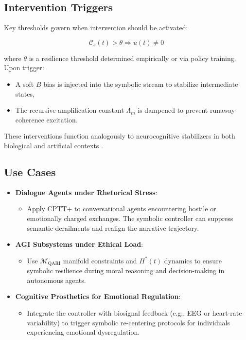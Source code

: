 \documentclass[12pt]{article}
\begin{document}
\subsection{Intervention Triggers}

Key thresholds govern when intervention should be activated:

\begin{equation}
\mathcal{C}_s(t) > \theta \Rightarrow u(t) \neq 0
\end{equation}

\noindent where $\theta$ is a resilience threshold determined empirically or via policy training. Upon trigger:

\begin{itemize}
  \item A soft $B$ bias is injected into the symbolic stream to stabilize intermediate states,
  \item The recursive amplification constant $\Lambda_m$ is dampened to prevent runaway coherence excitation.
\end{itemize}

These interventions function analogously to neurocognitive stabilizers in both biological and artificial contexts \cite{friston2010free, baars2013global}.

\subsection{Use Cases}

\begin{itemize}
  \item \textbf{Dialogue Agents under Rhetorical Stress}:
    \begin{itemize}
      \item Apply CPTT+ to conversational agents encountering hostile or emotionally charged exchanges. The symbolic controller can suppress semantic derailments and realign the narrative trajectory.
    \end{itemize}
  \item \textbf{AGI Subsystems under Ethical Load}:
    \begin{itemize}
      \item Use $\mathcal{M}_{\text{QARI}}$ manifold constraints and $\Pi^*(t)$ dynamics to ensure symbolic resilience during moral reasoning and decision-making in autonomous agents.
    \end{itemize}
  \item \textbf{Cognitive Prosthetics for Emotional Regulation}:
    \begin{itemize}
      \item Integrate the controller with biosignal feedback (e.g., EEG or heart-rate variability) to trigger symbolic re-centering protocols for individuals experiencing emotional dysregulation.
    \end{itemize}
\end{itemize}
\end{document}
